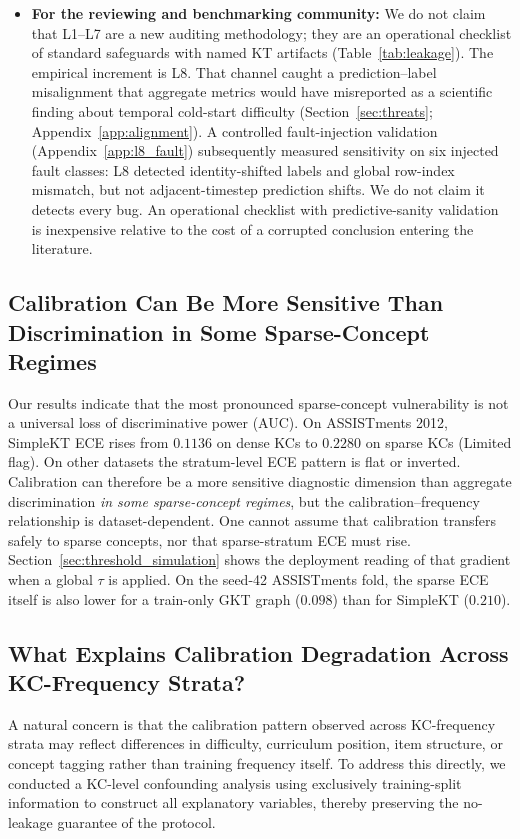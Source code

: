 \begin{itemize}
    \item \textbf{For the reviewing and benchmarking community:} We do not claim that L1--L7 are a new auditing methodology; they are an operational checklist of standard safeguards with named KT artifacts (Table~\ref{tab:leakage}). The empirical increment is L8. That channel caught a prediction--label misalignment that aggregate metrics would have misreported as a scientific finding about temporal cold-start difficulty (Section~\ref{sec:threats}; Appendix~\ref{app:alignment}). A controlled fault-injection validation (Appendix~\ref{app:l8_fault}) subsequently measured sensitivity on six injected fault classes: L8 detected identity-shifted labels and global row-index mismatch, but not adjacent-timestep prediction shifts. We do not claim it detects every bug. An operational checklist with predictive-sanity validation is inexpensive relative to the cost of a corrupted conclusion entering the literature.
\end{itemize}

\subsection{Calibration Can Be More Sensitive Than Discrimination in Some Sparse-Concept Regimes}
Our results indicate that the most pronounced sparse-concept vulnerability is not a universal loss of discriminative power (AUC). On ASSISTments 2012, SimpleKT ECE rises from $0.1136$ on dense KCs to $0.2280$ on sparse KCs (Limited flag). On other datasets the stratum-level ECE pattern is flat or inverted. Calibration can therefore be a more sensitive diagnostic dimension than aggregate discrimination \emph{in some sparse-concept regimes}, but the calibration--frequency relationship is dataset-dependent. One cannot assume that calibration transfers safely to sparse concepts, nor that sparse-stratum ECE must rise. Section~\ref{sec:threshold_simulation} shows the deployment reading of that gradient when a global $\tau$ is applied. On the seed-42 ASSISTments fold, the sparse ECE itself is also lower for a train-only GKT graph ($0.098$) than for SimpleKT ($0.210$).

\subsection{What Explains Calibration Degradation Across KC-Frequency Strata?}
\label{sec:a4_confounding}

A natural concern is that the calibration pattern observed across KC-frequency strata may reflect differences in difficulty, curriculum position, item structure, or concept tagging rather than training frequency itself.
To address this directly, we conducted a KC-level confounding analysis using exclusively training-split information to construct all explanatory variables, thereby preserving the no-leakage guarantee of the protocol.

